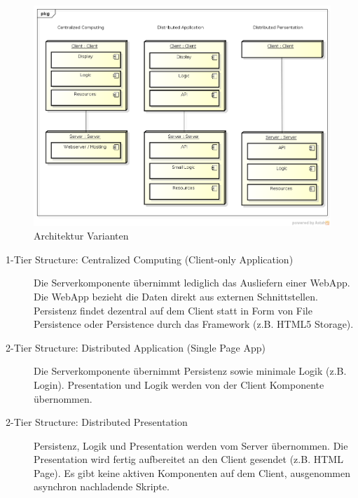 		\begin{figure}[H]
			\includegraphics[width=\textwidth]{architecture/media/img/tierArchitecture.png}
			\centering
			\caption{Architektur Varianten}
			\label{fig:tierArchitecture}
		\end{figure}
		\begin{description}
			\item[1-Tier Structure: Centralized Computing (Client-only Application)]
				Die Serverkomponente übernimmt lediglich das Ausliefern einer WebApp. 
				Die WebApp bezieht die Daten direkt aus externen Schnittstellen. 
				Persistenz findet dezentral auf dem Client statt in Form von File Persistence oder 
				Persistence durch das Framework (z.B. HTML5 Storage).
				
			\item[2-Tier Structure: Distributed Application (Single Page App)]
				Die Serverkomponente übernimmt Persistenz sowie minimale Logik (z.B. Login).
				Presentation und Logik werden von der Client Komponente übernommen.
				
			\item[2-Tier Structure: Distributed Presentation]
				Persistenz, Logik und Presentation werden vom Server übernommen.
				Die Presentation wird fertig aufbereitet an den Client gesendet (z.B. HTML Page).
				Es gibt keine aktiven Komponenten auf dem Client, ausgenommen asynchron nachladende Skripte.				
		\end{description}
	
